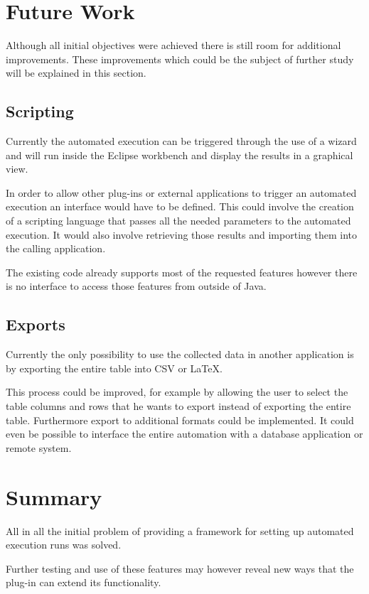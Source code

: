 \section{Future Work}
\label{section:AutoImprovements}
Although all initial objectives were achieved there is still room for additional
improvements. These improvements which could be the subject of further study will
be explained in this section.

\subsection{Scripting}
Currently the automated execution can be triggered through
the use of a wizard and will run inside the Eclipse workbench and display the results
in a graphical view. 

In order to allow other plug-ins or external applications to trigger
an automated execution an interface would have to be defined. This could involve the 
creation of a scripting language that passes all the needed parameters to the automated
execution. It would also involve retrieving those results and importing them into the 
calling application.

The existing code already supports most of the requested features however there is no
interface to access those features from outside of Java.

\subsection{Exports}
Currently the only possibility to use the collected data in
another application is by exporting the entire table into \ac{CSV} or \LaTeX .

This process could be improved, for example by allowing the user to select the table columns
and rows that he wants to export instead of exporting the entire table. Furthermore
export to additional formats could be implemented. It could even be possible to interface
the entire automation with a database application or remote system.

\section{Summary}
All in all the initial problem of providing a framework for setting up automated execution runs
was solved. 

Further testing and use of these features may however reveal new ways that the
plug-in can extend its functionality.
